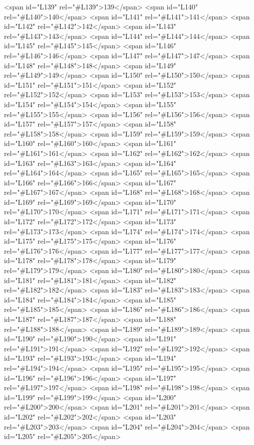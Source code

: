 <span id="L139" rel="#L139">139</span>
<span id="L140" rel="#L140">140</span>
<span id="L141" rel="#L141">141</span>
<span id="L142" rel="#L142">142</span>
<span id="L143" rel="#L143">143</span>
<span id="L144" rel="#L144">144</span>
<span id="L145" rel="#L145">145</span>
<span id="L146" rel="#L146">146</span>
<span id="L147" rel="#L147">147</span>
<span id="L148" rel="#L148">148</span>
<span id="L149" rel="#L149">149</span>
<span id="L150" rel="#L150">150</span>
<span id="L151" rel="#L151">151</span>
<span id="L152" rel="#L152">152</span>
<span id="L153" rel="#L153">153</span>
<span id="L154" rel="#L154">154</span>
<span id="L155" rel="#L155">155</span>
<span id="L156" rel="#L156">156</span>
<span id="L157" rel="#L157">157</span>
<span id="L158" rel="#L158">158</span>
<span id="L159" rel="#L159">159</span>
<span id="L160" rel="#L160">160</span>
<span id="L161" rel="#L161">161</span>
<span id="L162" rel="#L162">162</span>
<span id="L163" rel="#L163">163</span>
<span id="L164" rel="#L164">164</span>
<span id="L165" rel="#L165">165</span>
<span id="L166" rel="#L166">166</span>
<span id="L167" rel="#L167">167</span>
<span id="L168" rel="#L168">168</span>
<span id="L169" rel="#L169">169</span>
<span id="L170" rel="#L170">170</span>
<span id="L171" rel="#L171">171</span>
<span id="L172" rel="#L172">172</span>
<span id="L173" rel="#L173">173</span>
<span id="L174" rel="#L174">174</span>
<span id="L175" rel="#L175">175</span>
<span id="L176" rel="#L176">176</span>
<span id="L177" rel="#L177">177</span>
<span id="L178" rel="#L178">178</span>
<span id="L179" rel="#L179">179</span>
<span id="L180" rel="#L180">180</span>
<span id="L181" rel="#L181">181</span>
<span id="L182" rel="#L182">182</span>
<span id="L183" rel="#L183">183</span>
<span id="L184" rel="#L184">184</span>
<span id="L185" rel="#L185">185</span>
<span id="L186" rel="#L186">186</span>
<span id="L187" rel="#L187">187</span>
<span id="L188" rel="#L188">188</span>
<span id="L189" rel="#L189">189</span>
<span id="L190" rel="#L190">190</span>
<span id="L191" rel="#L191">191</span>
<span id="L192" rel="#L192">192</span>
<span id="L193" rel="#L193">193</span>
<span id="L194" rel="#L194">194</span>
<span id="L195" rel="#L195">195</span>
<span id="L196" rel="#L196">196</span>
<span id="L197" rel="#L197">197</span>
<span id="L198" rel="#L198">198</span>
<span id="L199" rel="#L199">199</span>
<span id="L200" rel="#L200">200</span>
<span id="L201" rel="#L201">201</span>
<span id="L202" rel="#L202">202</span>
<span id="L203" rel="#L203">203</span>
<span id="L204" rel="#L204">204</span>
<span id="L205" rel="#L205">205</span>
